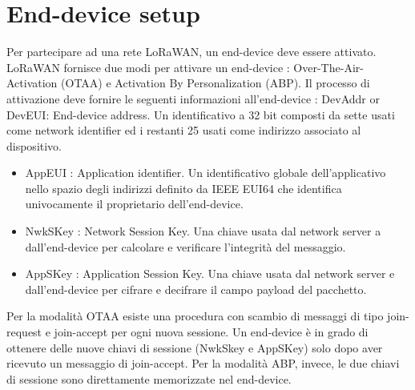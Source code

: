 \documentclass[12pt,a4paper,openright,twoside]{report}
\begin{document}
\section{End-device setup}
Per partecipare ad una rete LoRaWAN, un end-device deve essere attivato. LoRaWAN fornisce due modi per attivare un end-device : Over-The-Air-Activation (OTAA) e Activation By Personalization (ABP). Il processo di attivazione deve fornire le seguenti informazioni all'end-device :
DevAddr or DevEUI: End-device address. Un identificativo a 32 bit composti da sette usati come network identifier ed i restanti 25 usati come indirizzo associato al dispositivo.
\begin{itemize} 
\item AppEUI : Application identifier. Un identificativo globale dell'applicativo nello spazio degli indirizzi definito da IEEE EUI64 che identifica univocamente il proprietario dell'end-device.
\item NwkSKey : Network Session Key. Una chiave usata dal network server a dall'end-device per calcolare e verificare l'integrit\`a del messaggio.
\item AppSKey : Application Session Key. Una chiave usata dal network server e dall'end-device per cifrare e decifrare il campo payload del pacchetto.
\end{itemize}
Per la modalit\`a OTAA esiste una procedura con scambio di messaggi di tipo join-request e join-accept per ogni nuova sessione. Un end-device \`e in grado di ottenere delle nuove chiavi di sessione (NwkSkey e AppSKey) solo dopo aver ricevuto un messaggio di join-accept. 
Per la modalit\`a ABP, invece, le due chiavi di sessione sono direttamente memorizzate nel end-device.
\end{document}

